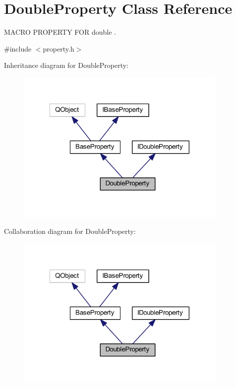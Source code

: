 \hypertarget{class_double_property}{\section{Double\-Property Class Reference}
\label{class_double_property}
}


M\-A\-C\-R\-O P\-R\-O\-P\-E\-R\-T\-Y F\-O\-R double .  




{\ttfamily \#include $<$property.\-h$>$}



Inheritance diagram for Double\-Property\-:
\nopagebreak
\begin{figure}[H]
\begin{center}
\leavevmode
\includegraphics[width=290pt]{class_double_property__inherit__graph}
\end{center}
\end{figure}


Collaboration diagram for Double\-Property\-:
\nopagebreak
\begin{figure}[H]
\begin{center}
\leavevmode
\includegraphics[width=290pt]{class_double_property__coll__graph}
\end{center}
\end{figure}

